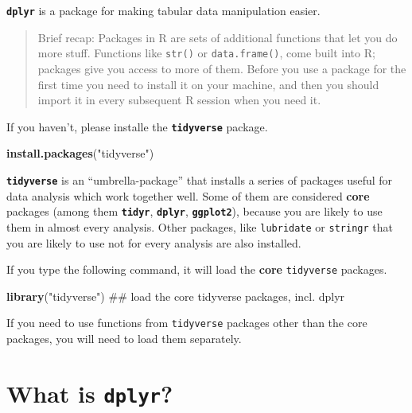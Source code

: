 \documentclass[]{book}
\newenvironment{Shaded}{\begin{snugshade}}{\end{snugshade}}
\newcommand{\KeywordTok}[1]{\textcolor[rgb]{0.13,0.29,0.53}{\textbf{#1}}}
\newcommand{\StringTok}[1]{\textcolor[rgb]{0.31,0.60,0.02}{#1}}
\newcommand{\NormalTok}[1]{#1}
\theoremstyle{definition}
\theoremstyle{definition}
\theoremstyle{definition}
\theoremstyle{remark}
\begin{document}
\textbf{\texttt{dplyr}} is a package for making tabular data
manipulation easier.

\begin{quote}
Brief recap: Packages in R are sets of additional functions that let you
do more stuff. Functions like \texttt{str()} or \texttt{data.frame()},
come built into R; packages give you access to more of them. Before you
use a package for the first time you need to install it on your machine,
and then you should import it in every subsequent R session when you
need it.
\end{quote}

If you haven't, please installe the \textbf{\texttt{tidyverse}} package.

\begin{Shaded}
\begin{Highlighting}[]
\KeywordTok{install.packages}\NormalTok{(}\StringTok{"tidyverse"}\NormalTok{)    }
\end{Highlighting}
\end{Shaded}

\textbf{\texttt{tidyverse}} is an ``umbrella-package'' that installs a
series of packages useful for data analysis which work together well.
Some of them are considered \textbf{core} packages (among them
\textbf{\texttt{tidyr}}, \textbf{\texttt{dplyr}},
\textbf{\texttt{ggplot2}}), because you are likely to use them in almost
every analysis. Other packages, like \texttt{lubridate} or
\texttt{stringr} that you are likely to use not for every analysis are
also installed.

If you type the following command, it will load the \textbf{core}
\texttt{tidyverse} packages.

\begin{Shaded}
\begin{Highlighting}[]
\KeywordTok{library}\NormalTok{(}\StringTok{"tidyverse"}\NormalTok{)    ## load the core tidyverse packages, incl. dplyr}
\end{Highlighting}
\end{Shaded}

If you need to use functions from \texttt{tidyverse} packages other than
the core packages, you will need to load them separately.

\section{\texorpdfstring{What is
\textbf{\texttt{dplyr}}?}{What is dplyr?}}\label{what-is-dplyr}
\end{document}
